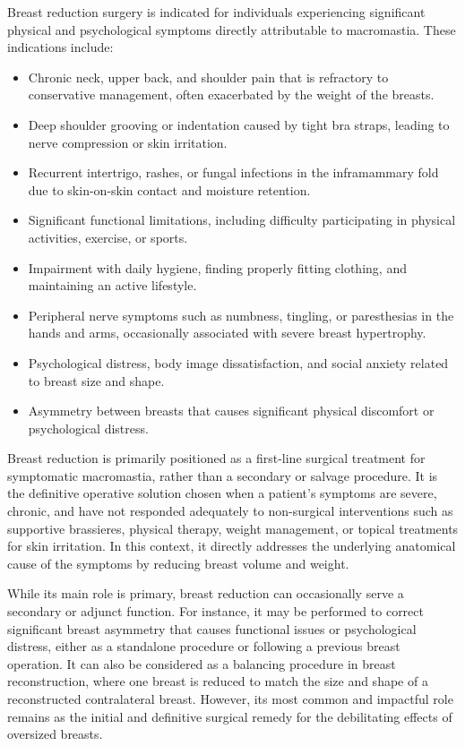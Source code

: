 Breast reduction surgery is indicated for individuals experiencing significant physical and psychological symptoms directly attributable to macromastia. These indications include:

\begin{itemize}
  \item Chronic neck, upper back, and shoulder pain that is refractory to conservative management, often exacerbated by the weight of the breasts.
  \item Deep shoulder grooving or indentation caused by tight bra straps, leading to nerve compression or skin irritation.
  \item Recurrent intertrigo, rashes, or fungal infections in the inframammary fold due to skin-on-skin contact and moisture retention.
  \item Significant functional limitations, including difficulty participating in physical activities, exercise, or sports.
  \item Impairment with daily hygiene, finding properly fitting clothing, and maintaining an active lifestyle.
  \item Peripheral nerve symptoms such as numbness, tingling, or paresthesias in the hands and arms, occasionally associated with severe breast hypertrophy.
  \item Psychological distress, body image dissatisfaction, and social anxiety related to breast size and shape.
  \item Asymmetry between breasts that causes significant physical discomfort or psychological distress.
\end{itemize}

Breast reduction is primarily positioned as a first-line surgical treatment for symptomatic macromastia, rather than a secondary or salvage procedure. It is the definitive operative solution chosen when a patient's symptoms are severe, chronic, and have not responded adequately to non-surgical interventions such as supportive brassieres, physical therapy, weight management, or topical treatments for skin irritation. In this context, it directly addresses the underlying anatomical cause of the symptoms by reducing breast volume and weight.

While its main role is primary, breast reduction can occasionally serve a secondary or adjunct function. For instance, it may be performed to correct significant breast asymmetry that causes functional issues or psychological distress, either as a standalone procedure or following a previous breast operation. It can also be considered as a balancing procedure in breast reconstruction, where one breast is reduced to match the size and shape of a reconstructed contralateral breast. However, its most common and impactful role remains as the initial and definitive surgical remedy for the debilitating effects of oversized breasts.

